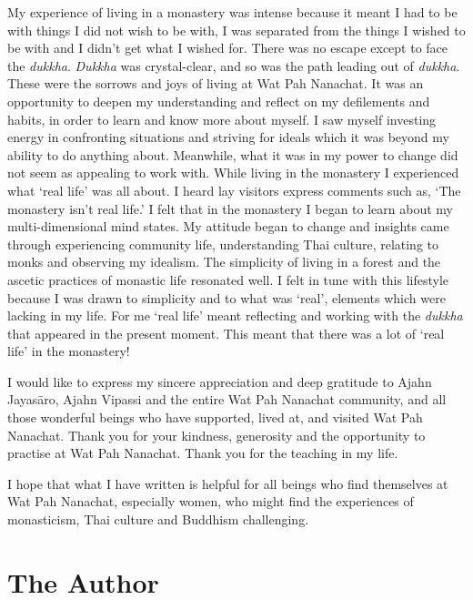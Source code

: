 My experience of living in a monastery was intense because it meant I
had to be with things I did not wish to be with, I was separated from
the things I wished to be with and I didn't get what I wished for. There
was no escape except to face the \emph{dukkha}. \emph{Dukkha} was
crystal-clear, and so was the path leading out of \emph{dukkha}. These
were the sorrows and joys of living at Wat Pah Nanachat. It was an
opportunity to deepen my understanding and reflect on my defilements and
habits, in order to learn and know more about myself. I saw myself
investing energy in confronting situations and striving for ideals which
it was beyond my ability to do anything about. Meanwhile, what it was in
my power to change did not seem as appealing to work with. While living
in the monastery I experienced what `real life' was all about. I heard
lay visitors express comments such as, `The monastery isn't real life.'
I felt that in the monastery I began to learn about my multi-dimensional
mind states. My attitude began to change and insights came through
experiencing community life, understanding Thai culture, relating to
monks and observing my idealism. The simplicity of living in a forest
and the ascetic practices of monastic life resonated well. I felt in
tune with this lifestyle because I was drawn to simplicity and to what
was `real', elements which were lacking in my life. For me `real life'
meant reflecting and working with the \emph{dukkha} that appeared in the
present moment. This meant that there was a lot of `real life' in the
monastery! 

I would like to express my sincere appreciation and deep gratitude to
Ajahn Jayasāro, Ajahn Vipassi and the entire Wat Pah Nanachat community, 
and all those wonderful beings who have supported, lived at, and visited
Wat Pah Nanachat. Thank you for your kindness, generosity and the
opportunity to practise at Wat Pah Nanachat. Thank you for the teaching
in my life. 

I hope that what I have written is helpful for all beings who find
themselves at Wat Pah Nanachat, especially women, who might find the
experiences of monasticism, Thai culture and Buddhism challenging. 

\clearpage

\section{The Author}

